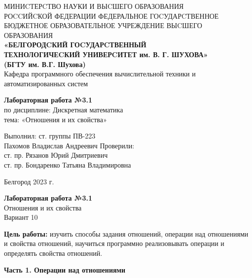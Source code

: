 \documentclass[a4paper,14pt]{extarticle}
\newcommand\textbox[1]{
	\parbox{.45\textwidth}{#1}
}
\begin{document}
	
	\begin{center}
		\small{
			МИНИCТЕРCТВО НАУКИ И ВЫCШЕГО ОБРАЗОВАНИЯ \\РОCCИЙCКОЙ ФЕДЕРАЦИИ
			\bigbreak
			ФЕДЕРАЛЬНОЕ ГОCУДАРCТВЕННОЕ БЮДЖЕТНОЕ ОБРАЗОВАТЕЛЬНОЕ УЧРЕЖДЕНИЕ ВЫCШЕГО ОБРАЗОВАНИЯ \\
			\bigbreak
			\textbf{«БЕЛГОРОДCКИЙ ГОCУДАРCТВЕННЫЙ \\ТЕХНОЛОГИЧЕCКИЙ УНИВЕРCИТЕТ им. В. Г. ШУХОВА»\\ (БГТУ им. В.Г. Шухова)} \\
			\bigbreak
			Кафедра программного обеспечения вычислительной техники и автоматизированных систем\\}
	\end{center}
	
	\vfill
	\begin{center}
		\large{
			\textbf{
				Лабораторная работа №3.1}}\\
		\normalsize{
			по дисциплине: Дискретная математика \\
			тема: «Отношения и их свойства»}
	\end{center}
	\vfill
	\hfill\textbox{
		Выполнил: ст. группы ПВ-223\\Пахомов Владислав Андреевич
		\bigbreak
		Проверили: \\ст. пр. Рязанов Юрий Дмитриевич\\
		ст. пр. Бондаренко Татьяна Владимировна
	}
	\vfill\begin{center}
		Белгород 2023 г.
	\end{center}
	\newpage
	\begin{center}
		\textbf{Лабораторная работа №3.1}\\
		Отношения и их свойства\\
		Вариант 10
	\end{center}
	\textbf{Цель работы: }изучить способы задания отношений, операции над отношениями и свойства отношений, научиться программно реализовывать операции и определять свойства отношений.
    \begin{center} \textbf{Часть 1. Операции над отношениями} \end{center}
    
\end{document}
